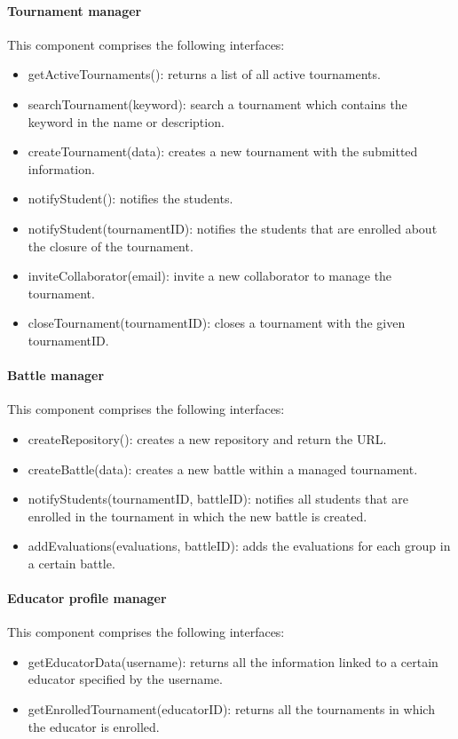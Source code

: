 \documentclass[12pt, a4paper]{report}
\begin{document}
    \paragraph*{Tournament manager}
    This component comprises the following interfaces: 
    \begin{itemize}
        \item getActiveTournaments(): returns a list of all active tournaments. 
        \item searchTournament(keyword): search a tournament which contains the keyword in the name or description. 
        \item createTournament(data): creates a new tournament with the submitted information. 
        \item notifyStudent(): notifies the students.
        \item notifyStudent(tournamentID): notifies the students that are enrolled about the closure of the tournament.
        \item inviteCollaborator(email): invite a new collaborator to manage the tournament. 
        \item closeTournament(tournamentID): closes a tournament with the given tournamentID. 
    \end{itemize}

    \paragraph*{Battle manager}
    This component comprises the following interfaces: 
    \begin{itemize}
        \item createRepository(): creates a new repository and return the URL. 
        \item createBattle(data): creates a new battle within a managed tournament. 
        \item notifyStudents(tournamentID, battleID): notifies all students that are enrolled in the tournament in which the new battle is created. 
        \item addEvaluations(evaluations, battleID): adds the evaluations for each group in a certain battle. 
    \end{itemize}

    \paragraph*{Educator profile manager}
    This component comprises the following interfaces: 
    \begin{itemize}
        \item getEducatorData(username): returns all the information linked to a certain educator specified by the username. 
        \item getEnrolledTournament(educatorID): returns all the tournaments in which the educator is enrolled. 
    \end{itemize}
\end{document}
